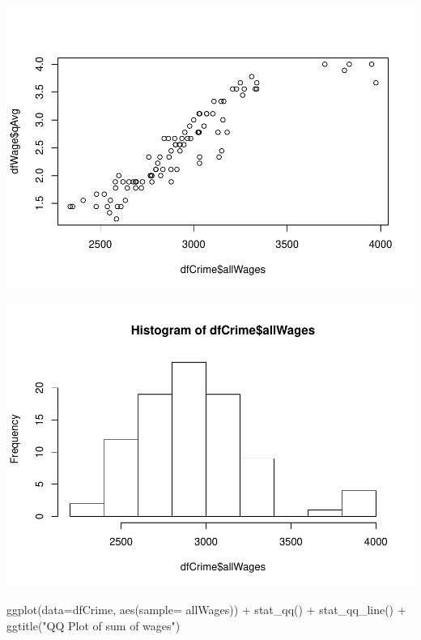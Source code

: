 \documentclass[]{article}
\newenvironment{Shaded}{}{}
\newcommand{\DataTypeTok}[1]{#1}
\newcommand{\KeywordTok}[1]{\textcolor[rgb]{0.00,0.00,1.00}{#1}}
\newcommand{\NormalTok}[1]{#1}
\newcommand{\OperatorTok}[1]{#1}
\newcommand{\StringTok}[1]{\textcolor[rgb]{0.00,0.50,0.50}{#1}}
\begin{document}
\includegraphics{Bagnard_Gaustad_Hartman_Leung_Lab_3_files/figure-latex/unnamed-chunk-73-1.pdf}

\begin{Shaded}
\end{Shaded}

\includegraphics{Bagnard_Gaustad_Hartman_Leung_Lab_3_files/figure-latex/unnamed-chunk-74-1.pdf}

\begin{Shaded}
\begin{Highlighting}[]
\KeywordTok{ggplot}\NormalTok{(}\DataTypeTok{data=}\NormalTok{dfCrime, }\KeywordTok{aes}\NormalTok{(}\DataTypeTok{sample=}\NormalTok{ allWages)) }\OperatorTok{+}\StringTok{ }\KeywordTok{stat_qq}\NormalTok{() }\OperatorTok{+}\StringTok{ }\KeywordTok{stat_qq_line}\NormalTok{() }\OperatorTok{+}
\StringTok{  }\KeywordTok{ggtitle}\NormalTok{(}\StringTok{"QQ Plot of sum of wages"}\NormalTok{)}
\end{Highlighting}
\end{Shaded}
\end{document}
